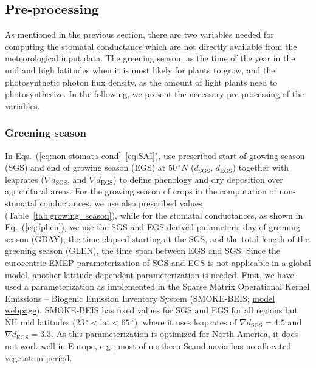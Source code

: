 \documentclass[gmd, manuscript]{copernicus}
\begin{document}
\subsection{Pre-processing}
\label{subsec:pre-pro}
As mentioned in the previous section, there are two variables needed for computing the stomatal conductance which are not directly available from the meteorological input data. The greening season, as the time of the year in the mid and high latitudes when it is most likely for plants to grow, and the photosynthetic photon flux density, as the amount of light plants need to photosynthesize. In the following, we present the necessary pre-processing of the variables.
\subsubsection{Greening season}
\label{subsubsec:greening}
In Eqs.~(\ref{eq:non-stomata-cond}--\ref{eq:SAI}), \citet{ACP:Simpson2012} use prescribed start of growing season (SGS) and end of growing season (EGS) at $50\,\unit{^\circ N}$ ($d_\text{SGS}$, $d_\text{EGS}$) together with leaprates ($\nabla d_\text{SGS}$, and $\nabla d_\text{EGS}$) to define phenology and dry deposition over agricultural areas. For the growing season of crops in the computation of non-stomatal conductances, we use also prescribed values (Table~\ref{tab:growing_season}), while for the stomatal conductances, as shown in Eq.~(\ref{eq:fphen}), we use the SGS and EGS derived parameters: day of greening season (GDAY), the time elapsed starting at the SGS, and the total length of the greening season (GLEN), the time span between EGS and SGS. Since the eurocentric EMEP parameterization of SGS and EGS is not applicable in a global model, another latitude dependent parameterization is needed. First, we have used a parameterization as implemented in the Sparse Matrix Operational Kernel Emissions -- Biogenic Emission Inventory System (SMOKE-BEIS; \href{https://www.epa.gov/air-emissions-modeling/biogenic-emission-inventory-system-beis}{model webpage}). SMOKE-BEIS has fixed values for SGS and EGS for all regions but NH mid latitudes ($23\,\unit{^\circ} < \text{lat} < 65\,\unit{^\circ}$), where it uses leaprates of $\nabla d_\text{SGS} = 4.5$ and $\nabla d_\text{EGS} = 3.3$. As this parameterization is optimized for North America, it does not work well in Europe, e.g., most of northern Scandinavia has no allocated vegetation period. 
\end{document}
